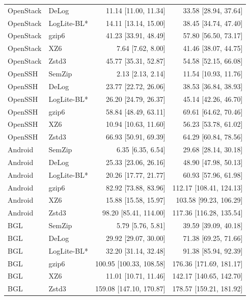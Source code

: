 \begin{longtable}{llrr}
OpenStack & DeLog & 11.14 [11.00, 11.34] & 33.58 [28.94, 37.64] \\
OpenStack & LogLite-BL* & 14.11 [13.14, 15.00] & 38.45 [34.74, 47.40] \\
OpenStack & gzip6 & 41.23 [33.91, 48.49] & 57.80 [56.50, 73.17] \\
OpenStack & XZ6 & 7.64 [7.62, 8.00] & 41.46 [38.07, 44.75] \\
OpenStack & Zstd3 & 45.77 [35.31, 52.87] & 54.58 [52.15, 66.08] \\
OpenSSH & SemZip & 2.13 [2.13, 2.14] & 11.54 [10.93, 11.76] \\
OpenSSH & DeLog & 23.77 [22.72, 26.06] & 38.53 [36.84, 38.93] \\
OpenSSH & LogLite-BL* & 26.20 [24.79, 26.37] & 45.14 [42.26, 46.70] \\
OpenSSH & gzip6 & 58.84 [48.49, 63.11] & 69.61 [64.62, 70.46] \\
OpenSSH & XZ6 & 10.94 [10.63, 11.60] & 56.23 [53.78, 61.02] \\
OpenSSH & Zstd3 & 66.93 [50.91, 69.39] & 64.29 [60.84, 78.56] \\
Android & SemZip & 6.35 [6.35, 6.54] & 29.68 [28.14, 30.18] \\
Android & DeLog & 25.33 [23.06, 26.16] & 48.90 [47.98, 50.13] \\
Android & LogLite-BL* & 20.26 [17.77, 21.77] & 60.93 [57.96, 61.98] \\
Android & gzip6 & 82.92 [73.88, 83.96] & 112.17 [108.41, 124.13] \\
Android & XZ6 & 15.88 [15.58, 15.97] & 103.58 [99.23, 106.29] \\
Android & Zstd3 & 98.20 [85.41, 114.00] & 117.36 [116.28, 135.54] \\
BGL & SemZip & 5.79 [5.76, 5.81] & 39.59 [39.09, 40.18] \\
BGL & DeLog & 29.92 [29.07, 30.00] & 71.38 [69.25, 71.66] \\
BGL & LogLite-BL* & 32.20 [31.14, 32.48] & 91.38 [85.94, 92.39] \\
BGL & gzip6 & 100.95 [100.33, 108.58] & 176.36 [171.69, 181.17] \\
BGL & XZ6 & 11.01 [10.71, 11.46] & 142.17 [140.65, 142.70] \\
BGL & Zstd3 & 159.08 [147.10, 170.87] & 178.57 [159.21, 181.92] \\
\bottomrule\end{longtable}
